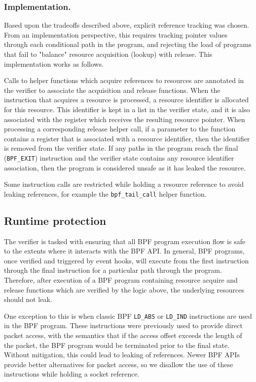 \documentclass[10pt,sigconf,authorversion]{lpc}
\begin{document}
\subsubsection{Implementation.}

Based upon the tradeoffs described above, explicit reference tracking was
chosen. From an implementation perspective, this requires tracking pointer
values through each conditional path in the program, and rejecting the load of
programs that fail to "balance" resource acquisition (lookup) with release.
This implementation works as follows.

Calls to helper functions which acquire references to resources are annotated
in the verifier to associate the acquisition and release functions. When the
instruction that acquires a resource is processed, a resource identifier is
allocated for this resource. This identifier is kept in a list in the verifier
state, and it is also associated with the register which receives the resulting
resource pointer. When processing a corresponding release helper call, if a
parameter to the function contains a register that is associated with a
resource identifier, then the identifier is removed from the verifier state. If
any paths in the program reach the final (\verb+BPF_EXIT+) instruction and the
verifier state contains any resource identifier association, then the program
is considered unsafe as it has leaked the resource.

Some instruction calls are restricted while holding a resource reference to
avoid leaking references, for example the \verb+bpf_tail_call+ helper function.

\subsection{Runtime protection}

The verifier is tasked with ensuring that all BPF program execution flow is
safe to the extents where it interacts with the BPF API. In general, BPF
programs, once verified and triggered by event hooks, will execute from the
first instruction through the final instruction for a particular path through
the program. Therefore, after execution of a BPF program containing resource
acquire and release functions which are verified by the logic above, the
underlying resources should not leak.

One exception to this is when classic BPF \verb+LD_ABS+ or \verb+LD_IND+
instructions are used in the BPF program. These instructions were previously
used to provide direct packet access, with the semantics that if the access
offset exceeds the length of the packet, the BPF program would be terminated
prior to the final state. Without mitigation, this could lead to leaking of
references. Newer BPF APIs provide better alternatives for packet access, so we
disallow the use of these instructions while holding a socket reference.
\end{document}
